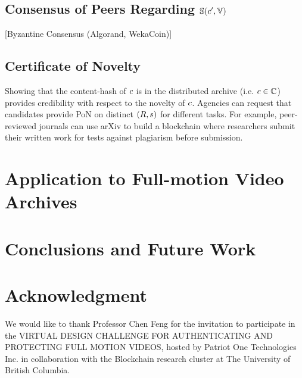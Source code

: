 \documentclass[conference]{IEEEtran}
\begin{document}
\subsection{Consensus of Peers Regarding ${\mathbb{S}}({c}^\prime, {\mathbb{V}})$}

[Byzantine Consensus (Algorand, WekaCoin)]
\subsection{Certificate of Novelty}
Showing that the content-hash of ${c}$ is in the distributed archive (i.e. ${c} \in {{\mathbb{C}}}$) provides credibility with respect to the novelty of ${c}$. Agencies can request that candidates provide PoN on distinct $(R, {s})$ for different tasks. For example, peer-reviewed journals can use arXiv to build a blockchain where researchers submit their written work for tests against plagiarism before submission.
\section{Application to Full-motion Video Archives}
\section{Conclusions and Future Work}
\section*{Acknowledgment}
We would like to thank Professor Chen Feng for the invitation to participate in the VIRTUAL DESIGN CHALLENGE FOR AUTHENTICATING  AND  PROTECTING  FULL  MOTION  VIDEOS, hosted by Patriot One Technologies Inc. in collaboration with the Blockchain research cluster at The University of British Columbia.
{}

\end{document}
